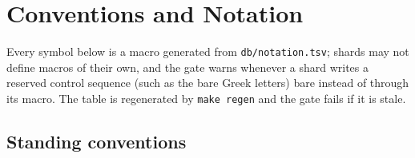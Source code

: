 
\section{Conventions and Notation}
\label{sec:conventions}

Every symbol below is a macro generated from \texttt{db/notation.tsv}; shards
may not define macros of their own, and the gate warns whenever a shard
writes a reserved control sequence (such as the bare Greek letters)
bare instead of through its macro. The table is regenerated by
\texttt{make regen} and the gate fails if it is stale.

\subsection{Standing conventions}

